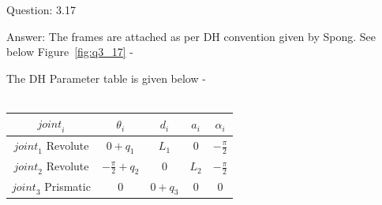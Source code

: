 \documentclass[a4paper]{article}
\begin{document}
\begin{qalist}
		\newpage	
		\item[Question: 3.17] \setcounter{equation}{0} %
		\item[Answer:] The frames are attached as per DH convention given by Spong. See below Figure~\ref{fig:q3_17} -\\
			\begin{minipage}{\linewidth}
				\vspace{0.5cm}
				\centering
				\label{fig:q3_17}
				\vspace{0.5cm}
			\end{minipage}
			The DH Parameter table is given below - \\ \\
			\begin{minipage}{\linewidth}
				\centering
				\begin{tabular}{|c|c|c|c|c|}
					\hline
					${joint}_{i}$ & ${\theta}_{i}$ & ${d}_{i}$ & ${a}_{i}$ & ${\alpha}_{i}$\\
					\hline \hline
					${joint}_{1}$ Revolute & $0 + {q}_{1}$ & ${L}_{1}$ & $0$ & $-\frac{\pi}{2}$\\
					\hline
					${joint}_{2}$ Revolute & $-\frac{\pi}{2} + {q}_{2}$ & $0$ & ${L}_{2}$ & $-\frac{\pi}{2}$\\
					\hline
					${joint}_{3}$ Prismatic & $0$ & $0 + {q}_{3}$ & $0$ & $0$\\
					\hline
				\end{tabular}
			\end{minipage}	
	\end{qalist}
\end{document}
